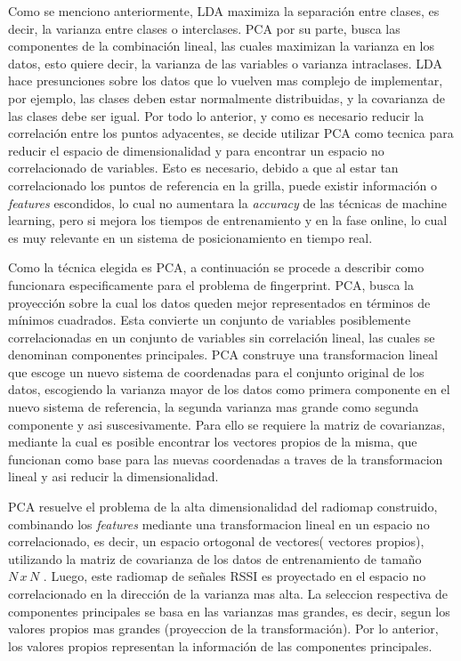 Como se menciono anteriormente, LDA maximiza la separación entre clases, es decir, la varianza entre clases o interclases. PCA por su parte, busca las componentes de la combinación lineal, las cuales maximizan la varianza en los datos, esto quiere decir, la varianza de las variables o varianza intraclases. LDA hace presunciones sobre los datos que lo vuelven mas complejo de implementar, por ejemplo, las clases deben estar normalmente distribuidas, y la covarianza de las clases debe ser igual. Por todo lo anterior, y como es necesario reducir la correlación entre los puntos adyacentes, se decide utilizar PCA como tecnica para reducir el espacio de dimensionalidad y para encontrar un espacio no correlacionado de variables. Esto es necesario, debido a que al estar tan correlacionado los puntos de referencia en la grilla, puede existir información o \textit{features} escondidos, lo cual no aumentara la \textit{accuracy} de las técnicas de machine learning, pero si mejora los tiempos de entrenamiento y en la fase online, lo cual es muy relevante en un sistema de posicionamiento en tiempo real.

Como la técnica elegida es PCA, a continuación se procede a describir como funcionara especificamente para el problema de fingerprint. PCA, busca la proyección sobre la cual los datos queden mejor representados en términos de mínimos cuadrados. Esta convierte un conjunto de variables posiblemente correlacionadas en un conjunto de variables sin correlación lineal, las cuales se denominan componentes principales. PCA construye una transformacion lineal que escoge un nuevo sistema de coordenadas para el conjunto original de los datos, escogiendo la varianza mayor de los datos como primera componente en el nuevo sistema de referencia, la segunda varianza mas grande como segunda componente y asi suscesivamente. Para ello se requiere la matriz de covarianzas, mediante la cual es posible encontrar los vectores propios de la misma, que funcionan como base para las nuevas coordenadas a traves de la transformacion lineal y asi reducir la dimensionalidad.

PCA resuelve el problema de la alta dimensionalidad del radiomap construido, combinando los \textit{features} mediante una transformacion lineal en un espacio no correlacionado, es decir, un espacio ortogonal de vectores( vectores propios), utilizando la matriz de covarianza de los datos de entrenamiento de tamaño $ N \, x \, N$ . Luego, este radiomap de señales RSSI es proyectado en el espacio no correlacionado en la dirección de la varianza mas alta. La seleccion respectiva de componentes principales se basa en las varianzas mas grandes, es decir, segun los valores propios mas grandes (proyeccion de la transformación). Por lo anterior, los valores propios representan la información de las componentes principales.

